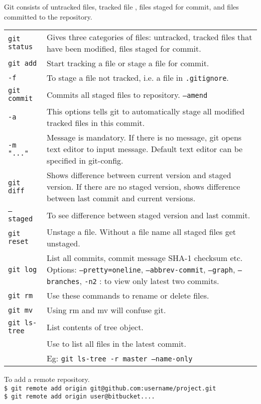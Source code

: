 Git consists of untracked files, tracked file , files staged for commit, and files committed to the repository. \\
\begin{tabularx}{\linewidth}{lX}
\texttt{git status} & Gives three categories of files: untracked, tracked files that have been modified, files staged for commit.\\
\texttt{git add} & Start tracking a file or stage a file for commit.\\
\texttt{-f} & To stage a file not tracked, i.e. a file in \texttt{.gitignore}.\\
\texttt{git commit} & Commits all staged files to repository. \texttt{--amend}\\
\texttt{-a} & This options tells git to automatically stage all modified tracked files in this commit.\\
\texttt{-m "..."} & Message is mandatory. If there is no message, git opens text editor to input message. Default text editor can be specified in git-config.\\
\texttt{git diff} & Shows difference between current version and staged version. If there are no staged version, shows difference between last commit and current versions.\\
\texttt{-- staged} & To see difference between staged version and last commit.\\
\texttt{git reset} & Unstage a file. Without a file name all staged files get unstaged.\\
\texttt{git log} & List all commits, commit message SHA-1 checksum etc. Options: \texttt{--pretty=oneline}, \texttt{--abbrev-commit}, \texttt{--graph}, \texttt{--branches}, \texttt{-n2} : to view only latest two commits.\\
\texttt{git rm} & Use these commands to rename or delete files.\\
\texttt{git mv} & Using rm and mv will confuse git.\\
\texttt{git ls-tree} & List contents of tree object.\\
 & Use to list all files in the latest commit.\\
 & Eg: \texttt{git ls-tree -r master --name-only}\\
\hline
\end{tabularx}

To add a remote repository.\\
\texttt{\$ git remote add origin git@github.com:username/project.git}\\
\texttt{\$ git remote add origin user@bitbucket....} \\

